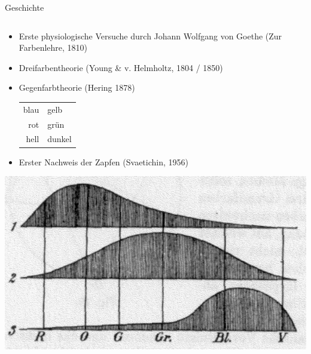 \documentclass[aspectratio=1610, 9pt]{beamer}
\begin{document}
\begin{frame}[c]{Geschichte}
  \begin{columns}[c, onlytextwidth]
    \hfill
    \begin{column}{0.59\textwidth}
      \begin{itemize}
        \item Erste physiologische Versuche durch Johann Wolfgang von Goethe (Zur Farbenlehre, 1810) \\
        \item Dreifarbentheorie (Young \& v. Helmholtz, 1804 / 1850)
        \item Gegenfarbtheorie (Hering 1878) \\
          \begin{tabular}{r @{${}⟷  {}$} l}
            blau & gelb \\
            rot & grün \\
            hell & dunkel \\
          \end{tabular}
        \item Erster Nachweis der Zapfen (Svaetichin, 1956) 
      \end{itemize}
      \begin{center}
        \includegraphics[width=0.7\linewidth]{images/YoungHelm.jpg}


\end{center}
\end{column}
\end{columns}
\end{frame}
\end{document}
